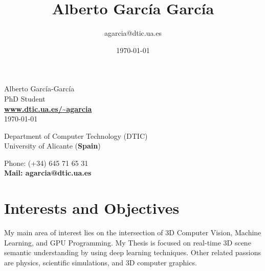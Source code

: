 \documentclass[8pt]{article}
\title{\bfseries\Huge Alberto García García}
\author{agarcia@dtic.ua.es}
\date{\today}
\begin{document}
\begin{center}
	\Huge Alberto García-García\\
	\Large PhD Student\\
	\Large \textbf{\url{www.dtic.ua.es/~agarcia}}\\
	\today
\end{center}
\bigskip
\begin{minipage}[ht]{0.65\textwidth}
Department of Computer Technology (DTIC)\\
University of Alicante (\textbf{Spain})\\
\end{minipage}
\hfill
\begin{minipage}[ht]{0.3\textwidth}
Phone: (+34) 645 71 65 31\\
\textbf{Mail: agarcia@dtic.ua.es}\\
\end{minipage}
 
\section*{Interests and Objectives}

My main area of interest lies on the intersection of 3D Computer Vision, Machine Learning, and GPU Programming. My Thesis is focused on real-time 3D scene semantic understanding by using deep learning techniques. Other related passions are physics, scientific simulations, and 3D computer graphics.
 
\end{document}

